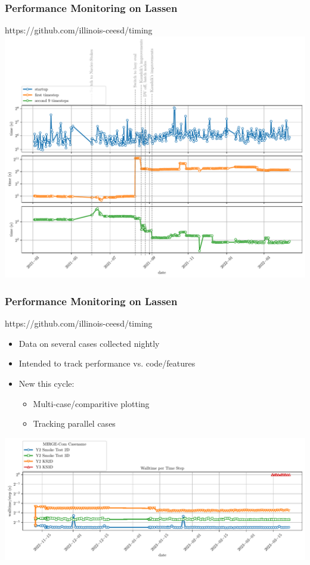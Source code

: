 \begin{frame}\frametitle{Performance Monitoring on Lassen}
\begin{center}
https://github.com/illinois-ceesd/timing\\
\includegraphics[width=.75\textwidth]{figures/mtc2/nozzle-lazy-full.pdf}
\end{center}
\end{frame}

\begin{frame}\frametitle{Performance Monitoring on Lassen}
\begin{center}
https://github.com/illinois-ceesd/timing
\end{center}
\begin{multicols}{2}
\begin{itemize}
\item Data on several cases collected nightly
\item Intended to track performance vs. code/features
\item New this cycle:
\begin{itemize}
\item Multi-case/comparitive plotting
\item Tracking parallel cases
\end{itemize}
\end{itemize}
\end{multicols}
\includegraphics[width=\textwidth]{figures/multicase_step.pdf}
\end{frame}


